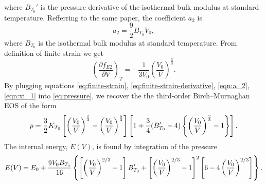 where $B_{T_0}'$ is the pressure derivative of the isothermal bulk modulus at
standard temperature. Refferring to the same paper, the coefficient $a_2$ is
\begin{equation}
  a_2 = \frac{9}{2} B_{T_0} V_0,
  \label{eqn:a_2}
\end{equation}
where $B_{T_0}$ is the isothermal bulk modulus at standard temperature. From
definition of finite strain we get
\begin{equation}
  \left(\frac{\partial f_{E2}}{\partial V}\right)_T = - \frac{1}{3 V_0} \left(
    \frac{V_0}{V}
  \right)^{\frac{5}{3}}.
  \label{eq:finite-strain-derivative}
\end{equation}
By plugging equations \eqref{eq:finite-strain},
\eqref{eq:finite-strain-derivative}, \eqref{eqn:a_2}, \eqref{eqn:xi_1} into
\eqref{eq:pressure}, we recover the the third-order Birch--Murnaghan EOS of
the form
\begin{equation}
  \small{p = \frac{3}{2} K_{T_0} \left[
    \left(\frac{V_0}{V}\right)^{\frac{7}{3}}
    - \left(\frac{V_0}{V}\right)^{\frac{5}{3}}
  \right] \left[
    1 + \frac{3}{4}(B_{T_0}' - 4)\left\{
      \left(\frac{V_0}{V}\right)^{\frac{2}{3}} - 1
    \right\}
  \right].}
\end{equation}
The internal energy, $E(V)$, is found by integration of the pressure
\begin{equation}\scriptsize{
  E(V) = E_0 + \frac{9 V_0 B_{T_0}}{16} \left\{
    \left[\left(\frac{V_0}{V}\right)^{2/3} - 1\right] B_{T_0}' +
    \left[\left(\frac{V_0}{V}\right)^{2/3} - 1\right]^2
    \left[6 - 4 \left(\frac{V_0}{V}\right)^{2/3}\right]
  \right\}.
}\end{equation}
